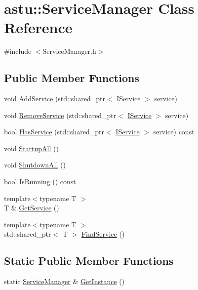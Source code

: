 \hypertarget{classastu_1_1ServiceManager}{}\section{astu\+:\+:Service\+Manager Class Reference}
\label{classastu_1_1ServiceManager}


{\ttfamily \#include $<$Service\+Manager.\+h$>$}

\subsection*{Public Member Functions}
\begin{DoxyCompactItemize}
\item 
void \hyperlink{classastu_1_1ServiceManager_a7c6743f699e8468c2102d2f84745de97}{Add\+Service} (std\+::shared\+\_\+ptr$<$ \hyperlink{classastu_1_1IService}{I\+Service} $>$ service)
\item 
void \hyperlink{classastu_1_1ServiceManager_afdf1a0f9645daf376b094f8fb5c203c1}{Remove\+Service} (std\+::shared\+\_\+ptr$<$ \hyperlink{classastu_1_1IService}{I\+Service} $>$ service)
\item 
bool \hyperlink{classastu_1_1ServiceManager_a34ae8a9d52eadd07571610502d20ba88}{Has\+Service} (std\+::shared\+\_\+ptr$<$ \hyperlink{classastu_1_1IService}{I\+Service} $>$ service) const
\item 
void \hyperlink{classastu_1_1ServiceManager_a7d4918c435a26a4212902ade5f9829b6}{Startup\+All} ()
\item 
void \hyperlink{classastu_1_1ServiceManager_a0ec3c06392ae4e7dab8d4b550bed1699}{Shutdown\+All} ()
\item 
bool \hyperlink{classastu_1_1ServiceManager_a64cea7132b9be6521a9af6f76009e5d4}{Is\+Running} () const
\item 
{\footnotesize template$<$typename T $>$ }\\T \& \hyperlink{classastu_1_1ServiceManager_a751f5f152803ee0327ab315cd5088414}{Get\+Service} ()
\item 
{\footnotesize template$<$typename T $>$ }\\std\+::shared\+\_\+ptr$<$ T $>$ \hyperlink{classastu_1_1ServiceManager_acef5ab6b48a9811b810851c69751f71a}{Find\+Service} ()
\end{DoxyCompactItemize}
\subsection*{Static Public Member Functions}
\begin{DoxyCompactItemize}
\item 
static \hyperlink{classastu_1_1ServiceManager}{Service\+Manager} \& \hyperlink{classastu_1_1ServiceManager_a26941fe98ea3f2792deca62e4124bf15}{Get\+Instance} ()
\end{DoxyCompactItemize}


